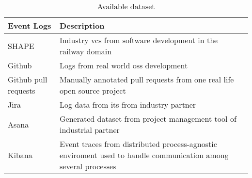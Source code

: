 \begin{table}[]
\centering
\caption{Available dataset}
\label{tab:dataset}
\begin{tabular}{@{}m{2.5cm}m{9cm}@{}}
\toprule
\textbf{Event Logs} & \textbf{Description} \\ \midrule
SHAPE & Industry \gls{vcs} from software development in the railway domain \\
Github & Logs from real world \gls{oss} development \\
Github pull requests & Manually annotated pull requests from one real life open source project \\
Jira & Log data from \gls{its} from industry partner \\
Asana & Generated dataset from project management tool of industrial partner \\
Kibana & Event traces from distributed process-agnostic enviroment used to handle communication among several processes \\ \bottomrule
\end{tabular}
\end{table}